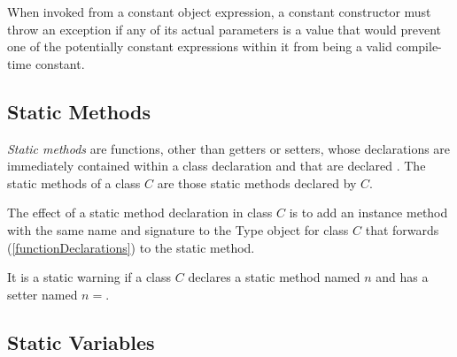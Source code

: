 \documentclass{article}
\newcommand{\code}[1]{{\sf #1}}
\begin{document}
\LMHash{}
When invoked from a constant object expression, a constant constructor must throw an exception if any of its actual parameters is a value that would prevent one of the potentially constant expressions within it from being a valid compile-time constant.


\subsection{Static Methods}

\LMHash{}
{\em Static methods} are functions, other than getters or setters, whose declarations are immediately contained within a class declaration and that are declared \STATIC{}. The static methods of a class $C$ are those static methods declared by $C$.

\LMHash{}
The effect of a static method declaration in class $C$ is to add an instance method with the same name and signature to the \code{Type} object for class $C$ that forwards (\ref{functionDeclarations})  to the static method.


\LMHash{}
It is a static warning if a class $C$ declares a static method named $n$ and has a setter named $n=$.



\subsection{Static Variables}
\end{document}
